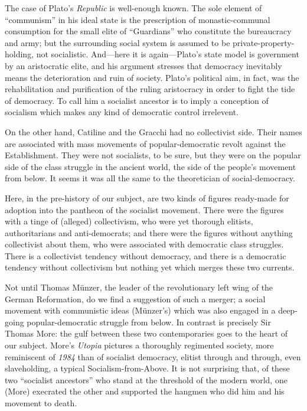 The case of Plato's \emph{Republic} is well-enough known. The sole element of ``communism'' in his ideal state is the prescription of monastic-communal consumption for the small elite of ``Guardians'' who constitute the bureaucracy and army; but the surrounding social system is assumed to be private-property-holding, not socialistic. And---here it is again---Plato's state model is government by an aristocratic elite, and his argument stresses that democracy inevitably means the deterioration and ruin of society. Plato's political aim, in fact, was the rehabilitation and purification of the ruling aristocracy in order to fight the tide of democracy. To call him a socialist ancestor is to imply a conception of socialism which makes any kind of democratic control irrelevent.

On the other hand, Catiline and the Gracchi had no collectivist side. Their names are associated with mass movements of popular-democratic revolt against the Establishment. They were not socialists, to be sure, but they were on the popular side of the class struggle in the ancient world, the side of the people's movement from below. It seems it was all the same to the theoretician of social-democracy.

Here, in the pre-history of our subject, are two kinds of figures ready-made for adoption into the pantheon of the socialist movement. There were the figures with a tinge of (alleged) collectivism, who were yet thorough elitists, authoritarians and anti-democrats; and there were the figures without anything collectivist about them, who were associated with democratic class struggles. There is a collectivist tendency without democracy, and there is a democratic tendency without collectivism but nothing yet which merges these two currents.

Not until Thomas M\"{u}nzer, the leader of the revolutionary left wing of the German Reformation, do we find a suggestion of such a merger; a social movement with communistic ideas (M\"{u}nzer's) which was also engaged in a deep-going popular-democratic struggle from below. In contrast is precisely Sir Thomas More: the gulf between these two contemporaries goes to the heart of our subject. More's \emph{Utopia} pictures a thoroughly regimented society, more reminiscent of \emph{1984} than of socialist democracy, elitist through and through, even slaveholding, a typical Socialism-from-Above. It is not surprising that, of these two ``socialist ancestors'' who stand at the threshold of the modern world, one (More) execrated the other and supported the hangmen who did him and his movement to death.

